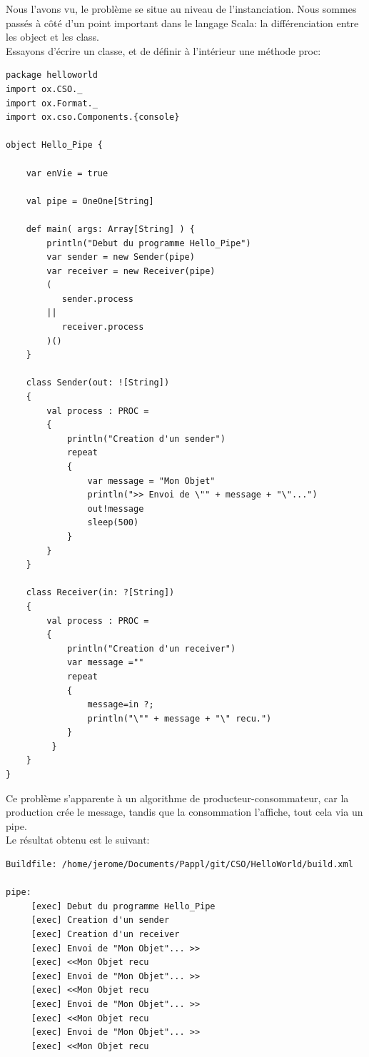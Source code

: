 \documentclass[a4paper,11pt,french]{report}
\begin{document}
Nous l'avons vu, le problème se situe au niveau de l'instanciation. Nous sommes passés à c\^oté d'un point important dans le langage Scala: la différenciation entre les \textsf{object} et les \textsf{class}.\\

Essayons d'écrire un classe, et de définir à l'intérieur une méthode \textsf{proc}:

\begin{lstlisting}[frame=trBL]
package helloworld
import ox.CSO._
import ox.Format._
import ox.cso.Components.{console}

object Hello_Pipe {

    var enVie = true

    val pipe = OneOne[String]

    def main( args: Array[String] ) {
        println("Debut du programme Hello_Pipe")
        var sender = new Sender(pipe)
        var receiver = new Receiver(pipe)
        ( 
           sender.process
        || 
           receiver.process
        )()
    }

    class Sender(out: ![String])
    {
        val process : PROC =
        { 
            println("Creation d'un sender")
            repeat 
            {
                var message = "Mon Objet"
                println(">> Envoi de \"" + message + "\"...")
                out!message
                sleep(500)
            }
        }  
    }

    class Receiver(in: ?[String])
    {
        val process : PROC =
        { 
            println("Creation d'un receiver")
            var message =""
            repeat 
            {
                message=in ?; 
                println("\"" + message + "\" recu.")
            }
         }  
    }   
}
\end{lstlisting}
\bigskip

Ce problème s'apparente à un algorithme de producteur-consommateur, car la production crée le message, tandis que la consommation l'affiche, tout cela via un pipe.\\
Le résultat obtenu est le suivant:


\begin{lstlisting}[frame=trBL]
Buildfile: /home/jerome/Documents/Pappl/git/CSO/HelloWorld/build.xml

pipe:
     [exec] Debut du programme Hello_Pipe
     [exec] Creation d'un sender
     [exec] Creation d'un receiver
     [exec] Envoi de "Mon Objet"... >>
     [exec] <<Mon Objet recu
     [exec] Envoi de "Mon Objet"... >>
     [exec] <<Mon Objet recu
     [exec] Envoi de "Mon Objet"... >>
     [exec] <<Mon Objet recu
     [exec] Envoi de "Mon Objet"... >>
     [exec] <<Mon Objet recu
\end{lstlisting}
\end{document}
